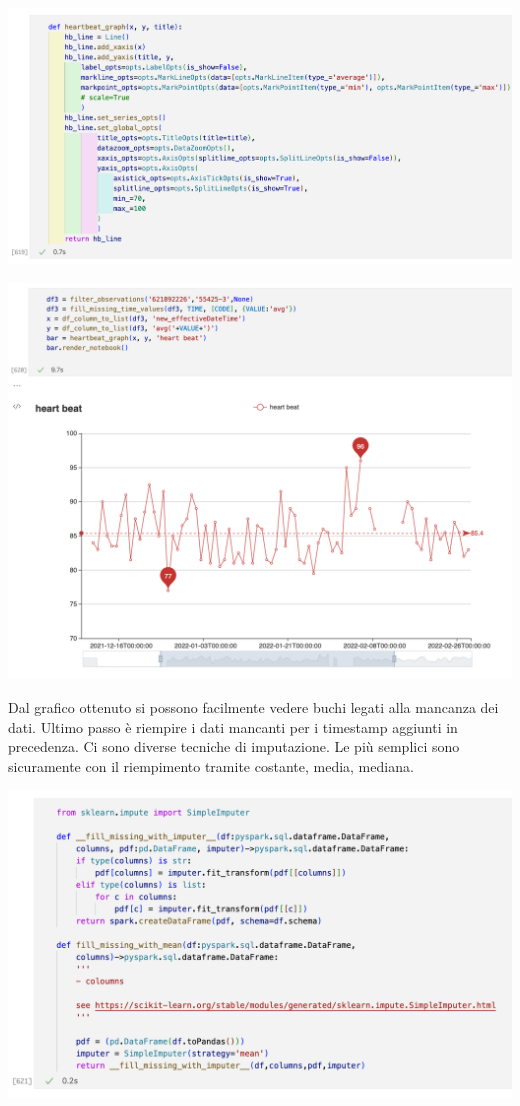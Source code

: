 \documentclass[11pt, oneside]{article}
\begin{document}
\begin{center}
\includegraphics[scale=0.45]{4_graph.png}
\end{center}
\begin{center}
\includegraphics[scale=0.45]{4_hb.png}
\end{center}

Dal grafico ottenuto si possono facilmente vedere buchi legati alla mancanza dei dati. Ultimo passo è riempire i dati mancanti per i timestamp aggiunti in precedenza. Ci sono diverse tecniche di imputazione. Le più semplici sono sicuramente con il riempimento tramite costante, media, mediana. 

\begin{center}
\includegraphics[scale=0.45]{4_sklearn.png}
\end{center}
\end{document}
